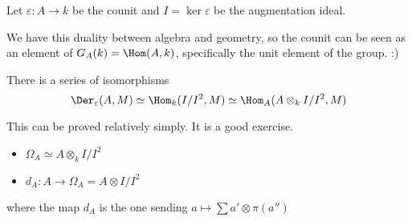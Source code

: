 \documentclass[12pt]{article}
\begin{document}
Let $\varepsilon:A\to k$ be the counit and $I=\ker\varepsilon$ be the augmentation ideal.
\begin{rmk}
	We have this duality between algebra and geometry, so the counit can be seen as an element of $G_A(k)=\Hom(A,k)$,
	specifically the unit element of the group. :)
\end{rmk}

\begin{lem}
	There is a series of isomorphisms
	\[\Der_\varepsilon(A,M)\simeq \Hom_k(I/I^2,M)\simeq\Hom_A(A\otimes_kI/I^2,M)\]
\end{lem}
This can be proved relatively simply. It is a good exercise.
\begin{thm}
	\begin{itemize}
		\item $\Omega_A\simeq A\otimes_k I/I^2$
		\item $d_A:A\to \Omega_A=A\otimes I/I^2$
	\end{itemize}
	where the map $d_A$ is the one sending $a\mapsto\sum a'\otimes \pi(a'')$
\end{thm}
\end{document}
